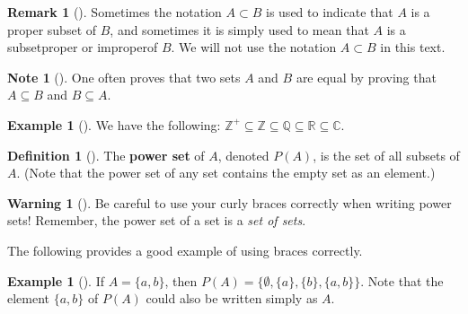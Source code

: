 \documentclass[10pt,]{book}
\newcommand{\terminology}[1]{\textbf{#1}}
\theoremstyle{plain}
\theoremstyle{definition}
\newtheorem{definition}[theorem]{Definition}
\theoremstyle{definition}
\newtheorem{remark}[theorem]{Remark}
\newtheorem{note}[theorem]{Note}
\newtheorem{warning}[theorem]{Warning}
\theoremstyle{definition}
\newtheorem{example}[theorem]{Example}
\theoremstyle{definition}
\numberwithin{equation}{section}
\def\Z{\mathbb{Z}}
\def\R{\mathbb{R}}
\def\Q{\mathbb{Q}}
\def\C{\mathbb{C}}
\begin{document}
\begin{remark}[]\label{remark-1}
Sometimes the notation \(A\subset B\) is  used to indicate that \(A\) is a proper subset of \(B\), and sometimes it is simply used to mean that \(A\) is a subset\textemdash{}proper or improper\textemdash{}of \(B\). We will not use the notation \(A \subset B\) in this text.%
\end{remark}
\begin{note}[]\label{note-3}
One often proves that two sets \(A\) and \(B\) are equal by proving that \(A\subseteq B\) and \(B\subseteq A\).%
\end{note}
\begin{example}[]\label{example-2}
We have the following: \(\Z^+ \subseteq \Z \subseteq \Q \subseteq \R \subseteq \C\).%
\end{example}
\begin{definition}[{}]\label{definition-5}
\label{notation-16}
The \terminology{power set} of \(A\), denoted \(P(A)\), is the set of all subsets of \(A\). (Note that the power set of any set contains the empty set as an element.)%
\end{definition}
\begin{warning}[]\label{warning-2}
Be careful to use your curly braces correctly when writing power sets! Remember, the power set of a set is a \emph{set of sets}.%
\end{warning}
The following provides a good example of using braces correctly.%
\begin{example}[]\label{example-3}
If \(A=\{a,b\}\), then \(P(A)=\{\emptyset, \{a\}, \{b\}, \{a,b\}\}\). Note that the element \(\{a,b\}\) of \(P(A)\) could also be written simply as \(A\).%
\end{example}
\end{document}

